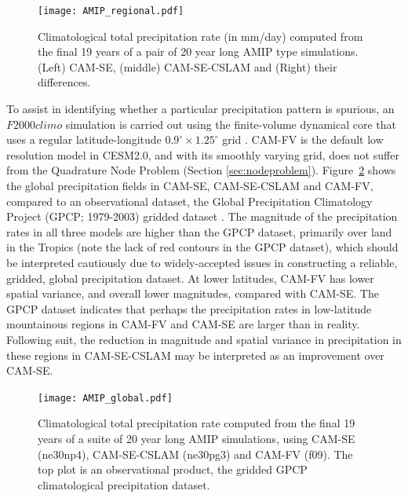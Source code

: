 \documentclass{ametsoc}
\begin{document}
{\begin{figure}[t]
\noindent\texttt{[image: AMIP\_regional.pdf]}\\
\caption{Climatological total precipitation rate (in mm/day) computed from the final 19 years of a pair of 20 year long AMIP type simulations. (Left) CAM-SE, (middle) CAM-SE-CSLAM and (Right) their differences.}
\label{fig:AMIP-region}
\end{figure}

To assist in identifying whether a particular precipitation pattern is spurious, an $F2000climo$ simulation is carried out using the finite-volume dynamical core that uses a regular latitude-longitude $0.9^{\circ}\times 1.25^\circ$ grid \citep[CAM-FV; $f09$ grid; ][]{CAM5}. CAM-FV is the default low resolution model in CESM2.0, and with its smoothly varying grid, does not suffer from the Quadrature Node Problem (Section \ref{sec:nodeproblem}). Figure~\ref{fig:AMIP-global} shows the global precipitation fields in CAM-SE, CAM-SE-CSLAM and CAM-FV, compared to an observational dataset, the Global Precipitation Climatology Project (GPCP; 1979-2003) gridded dataset \citep{H2001JH}. The magnitude of the precipitation rates in all three models are higher than the GPCP dataset, primarily over land in the Tropics (note the lack of red contours in the GPCP dataset), which should be interpreted cautiously due to widely-accepted issues in constructing a reliable, gridded, global precipitation dataset. At lower latitudes, CAM-FV has lower spatial variance, and overall lower magnitudes, compared with CAM-SE. The GPCP dataset indicates that perhaps the precipitation rates in low-latitude mountainous regions in CAM-FV and CAM-SE are larger than in reality. Following suit, the reduction in magnitude and spatial variance in precipitation in these regions in CAM-SE-CSLAM may be interpreted as an improvement over CAM-SE.

\begin{figure}[t]
\begin{center}
\noindent\texttt{[image: AMIP\_global.pdf]}\\
\end{center}
\caption{Climatological total precipitation rate computed from the final 19 years of a suite of 20 year long AMIP simulations, using CAM-SE (ne30np4), CAM-SE-CSLAM (ne30pg3) and CAM-FV (f09). The top plot is an observational product, the gridded GPCP climatological precipitation dataset.}
\label{fig:AMIP-global}
\end{figure}

}
\end{document}
